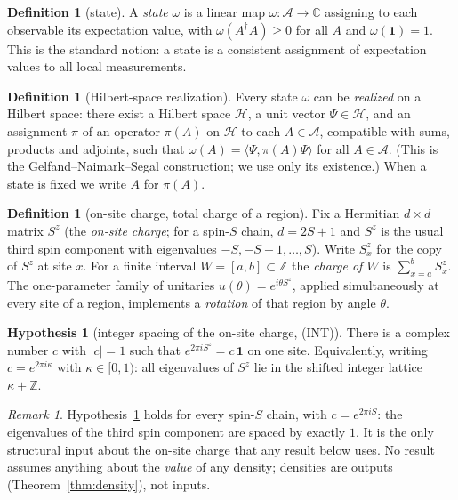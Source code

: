\documentclass[11pt]{article}
\theoremstyle{definition}
\newtheorem{definition}[theorem]{Definition}
\newtheorem{hypothesis}[theorem]{Hypothesis}
\theoremstyle{remark}
\newtheorem{remark}[theorem]{Remark}
\newcommand{\A}{\mathcal{A}}
\newcommand{\Hs}{\mathcal{H}}
\newcommand{\Z}{\mathbb{Z}}
\newcommand{\C}{\mathbb{C}}
\begin{document}
\begin{definition}[state]\label{def:state}
A \emph{state} $\omega$ is a linear map $\omega:\A\to\C$ assigning to each
observable its expectation value, with $\omega(A^\dagger A)\ge 0$ for all $A$
and $\omega(\mathbf{1})=1$.  This is the standard notion: a state is a
consistent assignment of expectation values to all local measurements.
\end{definition}

\begin{definition}[Hilbert-space realization]\label{def:gns}
Every state $\omega$ can be \emph{realized} on a Hilbert space: there exist a
Hilbert space $\Hs$, a unit vector $\Psi\in\Hs$, and an assignment $\pi$ of an
operator $\pi(A)$ on $\Hs$ to each $A\in\A$, compatible with sums, products
and adjoints, such that $\omega(A)=\langle\Psi,\pi(A)\Psi\rangle$ for all
$A\in\A$.  (This is the Gelfand--Naimark--Segal construction; we use only its
existence.)  When a state is fixed we write $A$ for $\pi(A)$.
\end{definition}

\begin{definition}[on-site charge, total charge of a region]\label{def:charge}
Fix a Hermitian $d\times d$ matrix $S^z$ (the \emph{on-site charge}; for a
spin-$S$ chain, $d=2S+1$ and $S^z$ is the usual third spin component with
eigenvalues $-S,-S+1,\dots,S$).  Write $S^z_x$ for the copy of $S^z$ at site
$x$.  For a finite interval $W=[a,b]\subset\Z$ the \emph{charge of $W$} is
$\sum_{x=a}^{b}S^z_x$.  The one-parameter family of unitaries
$u(\theta)=e^{i\theta S^z}$, applied simultaneously at every site of a region,
implements a \emph{rotation} of that region by angle $\theta$.
\end{definition}

\begin{hypothesis}[integer spacing of the on-site charge, (INT)]\label{hyp:int}
There is a complex number $c$ with $|c|=1$ such that
$e^{2\pi i S^z}=c\,\mathbf{1}$ on one site.  Equivalently, writing
$c=e^{2\pi i\kappa}$ with $\kappa\in[0,1)$: all eigenvalues of $S^z$ lie in
the shifted integer lattice $\kappa+\Z$.
\end{hypothesis}

\begin{remark}
Hypothesis~\ref{hyp:int} holds for every spin-$S$ chain, with
$c=e^{2\pi iS}$: the eigenvalues of the third spin component are spaced by
exactly $1$.  It is the only structural input about the on-site charge that
any result below uses.  No result assumes anything about the \emph{value} of
any density; densities are outputs (Theorem~\ref{thm:density}), not inputs.
\end{remark}
\end{document}
